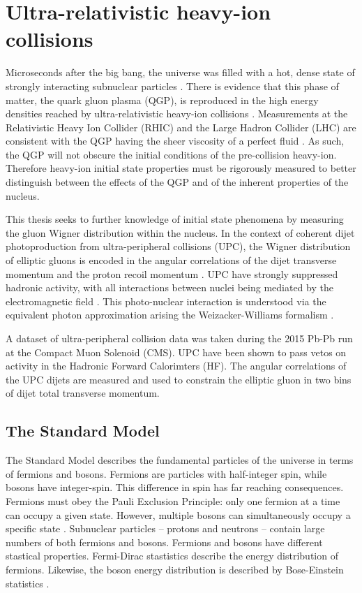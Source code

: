 \setlength\abovedisplayskip{0.4pt}
\setlength\belowdisplayskip{0.4pt}

\chapter{Ultra-relativistic heavy-ion collisions}

Microseconds after the big bang, the universe was filled with a hot, dense state of strongly interacting subnuclear particles \cite{Rafelski:2013obw}. There is evidence that this phase of matter, the quark gluon plasma (QGP), is reproduced in the high energy densities reached by ultra-relativistic heavy-ion collisions \cite{Arsene:2004fa}. Measurements at the Relativistic Heavy Ion Collider (RHIC) and the Large Hadron Collider (LHC) are consistent with the QGP having the sheer viscosity of a perfect fluid \cite{Long:796947}. As such, the QGP will not obscure the initial conditions of the pre-collision heavy-ion. Therefore heavy-ion initial state properties must be rigorously measured to better distinguish between the effects of the QGP and of the inherent properties of the nucleus.

This thesis seeks to further knowledge of initial state phenomena by measuring the gluon Wigner distribution within the nucleus. In the context of coherent dijet photoproduction from ultra-peripheral collisions (UPC), the Wigner distribution of elliptic gluons is encoded in the angular correlations of the dijet transverse momentum and the proton recoil momentum \cite{Hagiwara:2016kam}. UPC have strongly suppressed hadronic activity, with all interactions between nuclei being mediated by the electromagnetic field \cite{Contreras:2015dqa}. This photo-nuclear interaction is understood via the equivalent photon approximation arising the Weizacker-Williams formalism \cite{vonWeizsacker:1934sx}\cite{Williams:1934ad}. 

A dataset of ultra-peripheral collision data was taken during the 2015 Pb-Pb run at the Compact Muon Solenoid (CMS). UPC have been shown to pass vetos on activity in the Hadronic Forward Calorimters (HF). The angular correlations of the UPC dijets are measured and used to constrain the elliptic gluon in two bins of dijet total transverse momentum. 

\section{The Standard Model}

The Standard Model describes the fundamental particles of the universe in terms of fermions and bosons. Fermions are particles with half-integer spin, while bosons have integer-spin. This difference in spin has far reaching consequences. Fermions must obey the Pauli Exclusion Principle: only one fermion at a time can occupy a given state. However, multiple bosons can simultaneously occupy a specific state \cite{Dyson:1967:SM}. Subnuclear particles -- protons and neutrons -- contain large numbers of both fermions and bosons. Fermions and bosons have different stastical properties. Fermi-Dirac stastistics describe the energy distribution of fermions. Likewise, the boson energy distribution is described by Bose-Einstein statistics \cite{Huang_1987}. 

